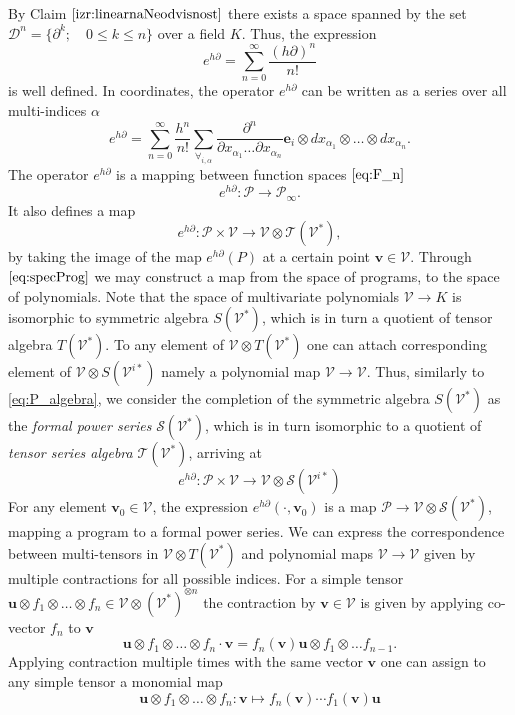 \documentclass[preprint,12pt]{elsarticle}
\newcommand{\Ss}{\mathcal{S}}
\newcommand{\T}{\mathcal{T}}
\newcommand{\VV}{\mathcal{V}}
\newcommand{\e}{\mathbf{e}}
\newcommand{\uu}{\mathbf{u}}
\newcommand{\vv}{\mathbf{v}}
\newcommand{\dP}{\mathcal{P}}
\newcommand{\D}{\partial}
\newcommand{\DD}{\mathcal{D}}
\begin{document}
 By Claim $\ref{izr:linearnaNeodvisnost}$  there exists a space spanned by the set $\DD^n=\{\D^k;\quad 0\le k\le n\}$ over a field $K$. Thus, the expression
 \begin{equation}
 	e^{h\D}=\sum\limits_{n=0}^{\infty}\frac{(h\D)^n}{n!}
 \end{equation}
 is well defined. In coordinates, the operator $e^{h\D}$ can be written as a
 series over all multi-indices $\alpha$
 \begin{equation}\label{eq:e^d}
 	e^{h\D}=\sum\limits_{n=0}^{\infty}\frac{h^n}{n!}\sum_{\forall_{i,\alpha}}\frac{\partial^n}{\partial
 		    x_{\alpha_1}\ldots \partial x_{\alpha_n}}\e_i\otimes
 		  dx_{\alpha_1}\otimes\ldots \otimes dx_{\alpha_n}.
 \end{equation}
The operator $e^{h\D}$ is a mapping between function spaces $\eqref{eq:F_n}$
 \begin{equation}
 	e^{h\D}:\dP\to\dP_\infty.
 \end{equation}
 It also defines a map
  \begin{equation}\label{eq:specProg}
  	e^{h\D}:\dP\times \VV\to \VV\otimes \T(\VV^*),
  \end{equation}
by taking the image of the map $e^{h\D}(P)$ at a certain point $\vv\in \VV$.  
Through $\eqref{eq:specProg}$ we may construct a map from the space of programs,
to the space of polynomials. Note that the space of multivariate polynomials
$\VV\to K$ is isomorphic to symmetric algebra $S(\VV^*)$, which is in turn a
quotient of tensor algebra $T(\VV^*)$.
To any element of
 $\VV\otimes T(\VV^*)$ one can attach corresponding element of $\VV\otimes S(\VV^{i*})$
 namely a polynomial map  $\VV\to \VV$. Thus, similarly to \eqref{eq:P_algebra}, we consider the completion of the symmetric algebra $S(\VV^*)$ as the \emph{formal power series} $\Ss(\VV^{*})$, which is in turn isomorphic to a quotient of \emph{tensor series algebra} $\T(\VV^*)$, arriving at 
 \begin{equation}\label{eq:pToPol}
 	e^{h\D}: \dP\times \VV\to \VV\otimes \Ss(\VV^{i*})
 \end{equation}
 For any element $\vv_0\in \VV$, the expression $e^{h\D}(\cdot,\vv_0)$ is a map $\dP\to
 \VV\otimes \Ss(\VV^*)$, mapping a program to a formal power series. We can express the
 correspondence between multi-tensors in $\VV\otimes T(\VV^*)$ and polynomial maps
 $\VV\to \VV$ given by multiple contractions for all possible indices. For a simple tensor $\uu\otimes
 f_1\otimes\ldots\otimes f_n\in \VV\otimes(\VV^*)^{\otimes n}$ the contraction by
 $\vv\in \VV$ is given by applying co-vector $f_n$ to $\vv$ 
 \begin{equation}
   \label{eq:contraction}
 \uu\otimes f_1\otimes\ldots\otimes f_n\cdot \vv = f_n(\vv) \uu\otimes f_1\otimes\ldots f_{n-1}.
 \end{equation}
Applying contraction multiple times with the same vector $\vv$ one can assign to
any simple tensor a monomial map 
 \begin{equation}
   \label{eq:tensor->poly}
 \uu\otimes f_1\otimes\ldots\otimes f_n: \vv \mapsto f_n(\vv)\cdots f_1(\vv) \uu
 \end{equation}
\end{document}
